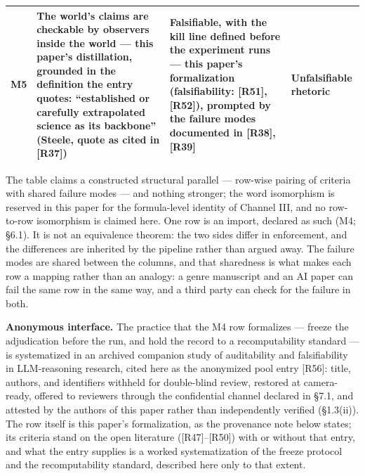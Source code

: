 \documentclass[11pt,a4paper]{article}
\begin{document}
\begin{table}[htbp]
\begin{tabularx}{0.985\textwidth}{@{}>{\raggedright\arraybackslash}p{}>{\raggedright\arraybackslash}X>{\raggedright\arraybackslash}X>{\raggedright\arraybackslash}p{}@{}}
M5 & The world's claims are checkable by observers inside the world — this paper's distillation, grounded in the definition the entry quotes: ``established or carefully extrapolated science as its backbone'' (Steele, quote as cited in [R37]) & Falsifiable, with the kill line defined before the experiment runs — this paper's formalization (falsifiability: [R51], [R52]), prompted by the failure modes documented in [R38], [R39] & Unfalsifiable rhetoric \\
\bottomrule
\end{tabularx}
\end{table}

The table claims a constructed structural parallel — row-wise pairing of criteria with shared failure modes — and nothing stronger; the word isomorphism is reserved in this paper for the formula-level identity of Channel III, and no row-to-row isomorphism is claimed here. One row is an import, declared as such (M4; §6.1). It is not an equivalence theorem: the two sides differ in enforcement, and the differences are inherited by the pipeline rather than argued away. The failure modes are shared between the columns, and that sharedness is what makes each row a mapping rather than an analogy: a genre manuscript and an AI paper can fail the same row in the same way, and a third party can check for the failure in both.

\textbf{Anonymous interface.} The practice that the M4 row formalizes — freeze the adjudication before the run, and hold the record to a recomputability standard — is systematized in an archived companion study of auditability and falsifiability in LLM-reasoning research, cited here as the anonymized pool entry [R56]: title, authors, and identifiers withheld for double-blind review, restored at camera-ready, offered to reviewers through the confidential channel declared in §7.1, and attested by the authors of this paper rather than independently verified (§1.3(ii)). The row itself is this paper's formalization, as the provenance note below states; its criteria stand on the open literature ([R47]–[R50]) with or without that entry, and what the entry supplies is a worked systematization of the freeze protocol and the recomputability standard, described here only to that extent.
\end{document}
